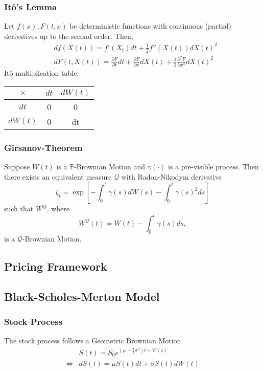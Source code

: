 \documentclass[11pt]{article}
\newcommand{\PR}{\mathbb{P}}
\newcommand{\Q}{\mathcal{Q}}
\begin{document}
	\subsubsection{It\^{o}'s Lemma}
	Let \( f(x), F(t, x) \) be deterministic functions with continuous (partial) derivatives up to the second order. Then, 
	\begin{align*}
		& df(X(t)) = f'(X_t) dt + \frac{1}{2}f''(X(t)) dX(t)^2 \\
		& dF(t, X(t)) = \frac{\partial F}{\partial t}dt + \frac{\partial F}{\partial x} dX(t) + \frac{1}{2}\frac{\partial^2 F}{\partial x^2} dX(t)^2
	\end{align*}
	It\^{o} multiplication table:
	\begin{center}
		\begin{tabular}{ccc}
			\( \times \) & \( dt \) & \( dW(t) \)\\
			\hline
			\hline
			\( dt \) & 0 & 0 \\
			\hline
			\( dW(t) \) & 0 & dt \\
			\hline
			\end{tabular}
		\end{center}
	\subsubsection{Girsanov-Theorem}
	Suppose \( W(t) \) is a \( \PR \)-Brownian Motion and \( \gamma(\cdot) \) is a pre-visible process. Then there exists an equivalent measure \( \Q \) with Radon-Nikodym derivative 
	\[	\zeta_t = \exp\left[-\int_{0}^{t}\gamma(s)dW(s) - \int_{0}^{t}\gamma(s)^2 ds\right]
		\]
	such that \( W^{Q} \), where
	\[	W^{\Q}(t) = W(t) - \int_{0}^{t} \gamma(s)ds,\]
	is a \( \Q \)-Brownian Motion.
	\subsection{Pricing Framework}
	\subsection{Black-Scholes-Merton Model}
	\subsubsection{Stock Process}
	The stock process follows a Geometric Brownian Motion
	\begin{align*}
	&S(t) = S_0 e^{\left(\mu - \frac{1}{2} \sigma^2\right)t + W(t)}
	\\[4pt]
	\iff &dS(t) = \mu S(t) dt + \sigma S(t) dW(t)
	\end{align*}
\end{document}
